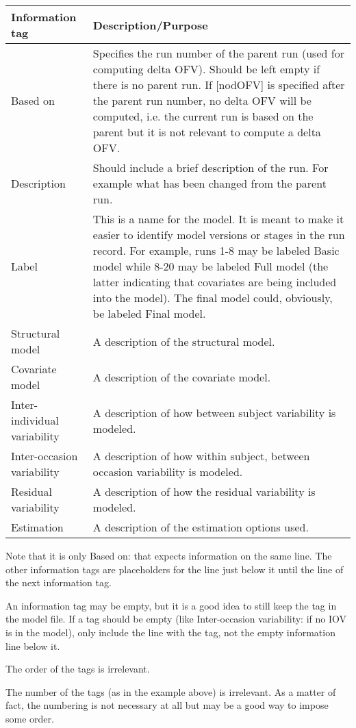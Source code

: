\documentclass[a4paper,12pt]{article}
\begin{document}
\begin{longtable}{|p{1.5in}|p{3.5in}|}
\hline
Information tag & Description/Purpose \\
\hline
Based on & Specifies the run number of the parent run (used for computing delta OFV). Should be left empty if there is no parent run. If [nodOFV] is specified after the parent run number, no delta OFV will be computed, i.e. the current run is based on the parent but it is not relevant to compute a delta OFV.\\
\hline
Description & Should include a brief description of the run. For example what has been changed from the parent run. \\
\hline
Label & This is a name for the model. It is meant to make it easier to identify model versions or stages in the run record. For example, runs 1-8 may be labeled Basic model while 8-20 may be labeled Full model (the latter indicating that covariates are being included into the model). The final model could, obviously, be labeled Final model. \\
\hline
Structural model & A description of the structural model. \\
\hline
Covariate model & A description of the covariate model. \\
\hline
Inter-individual variability & A description of how between subject variability is modeled. \\
\hline
Inter-occasion variability & A description of how within subject, between occasion variability is modeled. \\
\hline
Residual variability & A description of how the residual variability is modeled. \\
\hline
Estimation & A description of the estimation options used. \\
\hline
\end{longtable}

Note that it is only Based on: that expects information on the same line. The other information tags are placeholders for the line just below it until the line of the next information tag.

An information tag may be empty, but it is a good idea to still keep the tag in the model file.  If a tag should be empty (like Inter-occasion variability: if no IOV is in the model), only include the line with the tag, not the empty information line below it.

The order of the tags is irrelevant.

The number of the tags (as in the example above) is irrelevant. As a matter of fact, the numbering is not necessary at all but may be a good way to impose some order.
\end{document}
